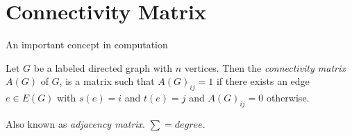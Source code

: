 \section{Connectivity Matrix}



An important concept in computation

\begin{definition}
  Let $G$ be a labeled directed graph with $n$ vertices. Then the
  \textit{connectivity matrix} $A(G)$ of $G$, is a matrix such that
  $A(G)_{ij} = 1$ if there exists an edge $e \in E(G)$ with $s(e)=i$
  and $t(e)=j$ and $A(G)_{ij} = 0$ otherwise.
\end{definition}

Also known as \textit{adjacency matrix}. $\sum = degree$.


% 





